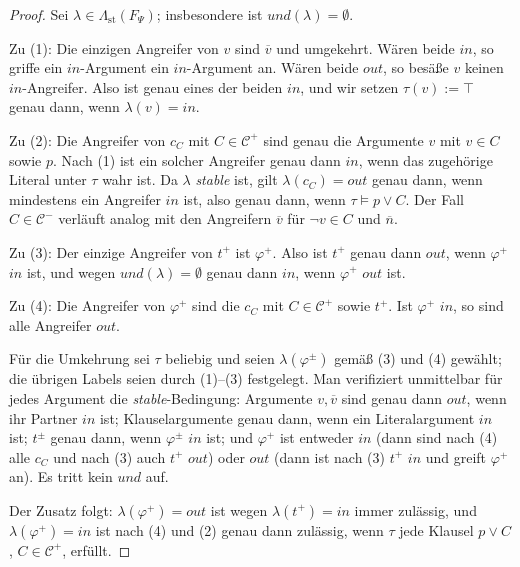 \begin{proof}
    Sei \(\lambda\in\Lambda_{\mathrm{st}}(F_\Psi)\); insbesondere ist
    \(\mathit{und}(\lambda)=\emptyset\).

    Zu (1): Die einzigen Angreifer von \(v\) sind \(\overline{v}\) und
    umgekehrt. Wären beide \(\mathit{in}\), so griffe ein
    \(\mathit{in}\)-Argument ein \(\mathit{in}\)-Argument an. Wären beide
    \(\mathit{out}\), so besäße \(v\) keinen \(\mathit{in}\)-Angreifer. Also ist
    genau eines der beiden \(\mathit{in}\), und wir setzen
    \(\tau(v):=\top\) genau dann, wenn \(\lambda(v)=\mathit{in}\).

    Zu (2): Die Angreifer von \(c_C\) mit \(C\in\mathcal{C}^{+}\) sind genau
    die Argumente \(v\) mit \(v\in C\) sowie \(p\). Nach (1) ist ein solcher
    Angreifer genau dann \(\mathit{in}\), wenn das zugehörige Literal unter
    \(\tau\) wahr ist. Da \(\lambda\) \textit{stable} ist, gilt
    \(\lambda(c_C)=\mathit{out}\) genau dann, wenn mindestens ein Angreifer
    \(\mathit{in}\) ist, also genau dann, wenn \(\tau\models p\lor C\). Der Fall
    \(C\in\mathcal{C}^{-}\) verläuft analog mit den Angreifern \(\overline{v}\)
    für \(\neg v\in C\) und \(\overline{n}\).

    Zu (3): Der einzige Angreifer von \(t^{+}\) ist \(\varphi^{+}\). Also ist
    \(t^{+}\) genau dann \(\mathit{out}\), wenn \(\varphi^{+}\) \(\mathit{in}\)
    ist, und wegen \(\mathit{und}(\lambda)=\emptyset\) genau dann
    \(\mathit{in}\), wenn \(\varphi^{+}\) \(\mathit{out}\) ist.

    Zu (4): Die Angreifer von \(\varphi^{+}\) sind die \(c_C\) mit
    \(C\in\mathcal{C}^{+}\) sowie \(t^{+}\). Ist \(\varphi^{+}\)
    \(\mathit{in}\), so sind alle Angreifer \(\mathit{out}\).

    Für die Umkehrung sei \(\tau\) beliebig und seien
    \(\lambda(\varphi^{\pm})\) gemäß (3) und (4) gewählt; die übrigen Labels
    seien durch (1)--(3) festgelegt. Man verifiziert unmittelbar für jedes
    Argument die \textit{stable}-Bedingung: Argumente \(v,\overline{v}\) sind
    genau dann \(\mathit{out}\), wenn ihr Partner \(\mathit{in}\) ist;
    Klauselargumente genau dann, wenn ein Literalargument \(\mathit{in}\) ist;
    \(t^{\pm}\) genau dann, wenn \(\varphi^{\pm}\) \(\mathit{in}\) ist; und
    \(\varphi^{+}\) ist entweder \(\mathit{in}\) (dann sind nach (4) alle
    \(c_C\) und nach (3) auch \(t^{+}\) \(\mathit{out}\)) oder \(\mathit{out}\)
    (dann ist nach (3) \(t^{+}\) \(\mathit{in}\) und greift \(\varphi^{+}\) an).
    Es tritt kein \(\mathit{und}\) auf.

    Der Zusatz folgt: \(\lambda(\varphi^{+})=\mathit{out}\) ist wegen
    \(\lambda(t^{+})=\mathit{in}\) immer zulässig, und
    \(\lambda(\varphi^{+})=\mathit{in}\) ist nach (4) und (2) genau dann
    zulässig, wenn \(\tau\) jede Klausel \(p\lor C\), \(C\in\mathcal{C}^{+}\),
    erfüllt.
\end{proof}

